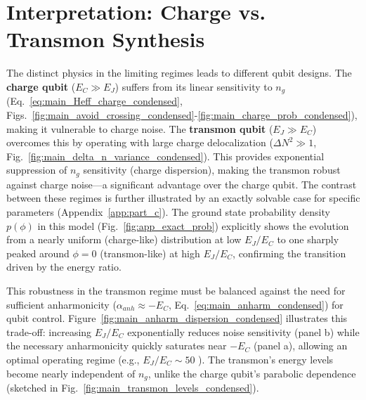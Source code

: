 \documentclass[12pt]{article}
\begin{document}
\section*{Interpretation: Charge vs. Transmon Synthesis}
The distinct physics in the limiting regimes leads to different qubit designs. The \textbf{charge qubit} ($E_C \gg E_J$) suffers from its linear sensitivity to $n_g$ (Eq.~\eqref{eq:main_Heff_charge_condensed}, Figs.~\ref{fig:main_avoid_crossing_condensed}-\ref{fig:main_charge_prob_condensed}), making it vulnerable to charge noise. 
The \textbf{transmon qubit} ($E_J \gg E_C$) overcomes this by operating with large charge delocalization ($\Delta N^2 \gg 1$, Fig.~\ref{fig:main_delta_n_variance_condensed}). This provides exponential suppression of $n_g$ sensitivity (charge dispersion), making the transmon robust against charge noise—a significant advantage over the charge qubit. 
The contrast between these regimes is further illustrated by an exactly solvable case for specific parameters (Appendix~\ref{app:part_c}). The ground state probability density $p(\phi)$ in this model (Fig.~\ref{fig:app_exact_prob}) explicitly shows the evolution from a nearly uniform (charge-like) distribution at low $E_J/E_C$ to one sharply peaked around $\phi=0$ (transmon-like) at high $E_J/E_C$, confirming the transition driven by the energy ratio.



This robustness in the transmon regime must be balanced against the need for sufficient anharmonicity ($\alpha_{anh} \approx -E_C$, Eq.~\eqref{eq:main_anharm_condensed}) for qubit control. Figure~\ref{fig:main_anharm_dispersion_condensed} illustrates this trade-off: increasing $E_J/E_C$ exponentially reduces noise sensitivity (panel b) while the necessary anharmonicity quickly saturates near $-E_C$ (panel a), allowing an optimal operating regime (e.g., $E_J/E_C \sim 50$ \cite{Koch2007, Kjaergaard2020}). The transmon's energy levels become nearly independent of $n_g$, unlike the charge qubit's parabolic dependence (sketched in Fig.~\ref{fig:main_transmon_levels_condensed}).
\end{document}
